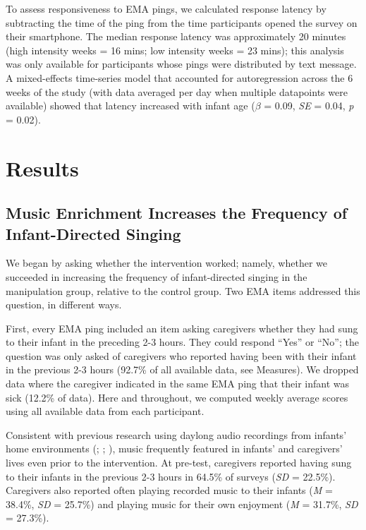 \documentclass[
]{article}
\begin{document}
To assess responsiveness to EMA pings, we calculated response latency by
subtracting the time of the ping from the time participants opened the
survey on their smartphone. The median response latency was
approximately 20 minutes (high intensity weeks = 16 mins; low intensity
weeks = 23 mins); this analysis was only available for participants
whose pings were distributed by text message. A mixed-effects
time-series model that accounted for autoregression across the 6 weeks
of the study (with data averaged per day when multiple datapoints were
available) showed that latency increased with infant age (\(\beta\) =
0.09, \emph{SE} = 0.04, \emph{p} = 0.02).

\section{Results}\label{results}

\subsection{Music Enrichment Increases the Frequency of Infant-Directed
Singing}\label{music-enrichment-increases-the-frequency-of-infant-directed-singing}

We began by asking whether the intervention worked; namely, whether we
succeeded in increasing the frequency of infant-directed singing in the
manipulation group, relative to the control group. Two EMA items
addressed this question, in different ways.

First, every EMA ping included an item asking caregivers whether they
had sung to their infant in the preceding 2-3 hours. They could respond
``Yes'' or ``No''; the question was only asked of caregivers who
reported having been with their infant in the previous 2-3 hours (92.7\%
of all available data, see Measures). We dropped data where the
caregiver indicated in the same EMA ping that their infant was sick
(12.2\% of data). Here and throughout, we computed weekly average scores
using all available data from each participant.

Consistent with previous research using daylong audio recordings from
infants' home environments (; ; ), music frequently featured in infants' and caregivers' lives even
prior to the intervention. At pre-test, caregivers reported having sung
to their infants in the previous 2-3 hours in 64.5\% of surveys
(\emph{SD} = 22.5\%). Caregivers also reported often playing recorded
music to their infants (\emph{M} = 38.4\%, \emph{SD} = 25.7\%) and
playing music for their own enjoyment (\emph{M} = 31.7\%, \emph{SD} =
27.3\%).
\end{document}
